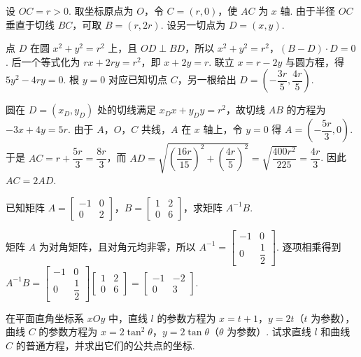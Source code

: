 \begin{solution}
设 \(OC=r>0\). 取坐标原点为 \(O\)，令 \(C=(r,0)\)，使 \(AC\) 为 \(x\) 轴. 由于半径 \(OC\) 垂直于切线 \(BC\)，可取 \(B=(r,2r)\). 设另一切点为 \(D=(x,y)\).

点 \(D\) 在圆 \(x^2+y^2=r^2\) 上，且 \(OD\perp BD\)，所以
\(x^2+y^2=r^2\)，\((B-D)\cdot D=0\). 后一个等式化为 \(rx+2ry=r^2\)，即 \(x+2y=r\). 联立 \(x=r-2y\) 与圆方程，得 \(5y^2-4ry=0\). 根 \(y=0\) 对应已知切点 \(C\)，另一根给出
\(D=\left(-\dfrac{3r}{5},\dfrac{4r}{5}\right)\).

圆在 \(D=(x_D,y_D)\) 处的切线满足 \(x_Dx+y_Dy=r^2\)，故切线 \(AB\) 的方程为 \(-3x+4y=5r\). 由于 \(A\)，\(O\)，\(C\) 共线，\(A\) 在 \(x\) 轴上，令 \(y=0\) 得 \(A=\left(-\dfrac{5r}{3},0\right)\). 于是
\(AC=r+\dfrac{5r}{3}=\dfrac{8r}{3}\)，而
\(AD=\sqrt{\left(\dfrac{16r}{15}\right)^2+\left(\dfrac{4r}{5}\right)^2}=\sqrt{\dfrac{400r^2}{225}}=\dfrac{4r}{3}\). 因此 \(AC=2AD\).
\end{solution}

\reuseproblemnumber
\begin{problem}[B]
已知矩阵 \(A=\begin{bmatrix}-1&0\\0&2\end{bmatrix}\)，\(B=\begin{bmatrix}1&2\\0&6\end{bmatrix}\)，求矩阵 \(A^{-1}B\).
\end{problem}

\begin{solution}
矩阵 \(A\) 为对角矩阵，且对角元均非零，所以
\(A^{-1}=\begin{bmatrix}-1&0\\0&\dfrac12\end{bmatrix}\). 逐项相乘得到
\(A^{-1}B=\begin{bmatrix}-1&0\\0&\dfrac12\end{bmatrix}\begin{bmatrix}1&2\\0&6\end{bmatrix}=\begin{bmatrix}-1&-2\\0&3\end{bmatrix}\).
\end{solution}

\reuseproblemnumber
\begin{problem}[C]
在平面直角坐标系 \(xOy\) 中，直线 \(l\) 的参数方程为 \(x=t+1\)，\(y=2t\)（\(t\) 为参数），曲线 \(C\) 的参数方程为 \(x=2\tan^2\theta\)，\(y=2\tan\theta\)（\(\theta\) 为参数）. 试求直线 \(l\) 和曲线 \(C\) 的普通方程，并求出它们的公共点的坐标.
\end{problem}

